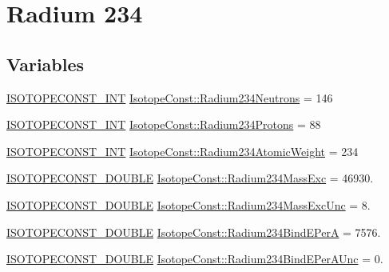\hypertarget{group___isotope_const-_radium-_ra234}{}\section{Radium 234}
\label{group___isotope_const-_radium-_ra234}
\subsection*{Variables}
\begin{DoxyCompactItemize}
\item 
\mbox{\hyperlink{group___isotope_const-_macros_ga5f18360b3e99483a35c32d789e62621c}{I\+S\+O\+T\+O\+P\+E\+C\+O\+N\+S\+T\+\_\+\+I\+NT}} \mbox{\hyperlink{group___isotope_const-_radium-_ra234_ga9af7d9100db8fe6e5155fb180ee6fbdd}{Isotope\+Const\+::\+Radium234\+Neutrons}} = 146
\item 
\mbox{\hyperlink{group___isotope_const-_macros_ga5f18360b3e99483a35c32d789e62621c}{I\+S\+O\+T\+O\+P\+E\+C\+O\+N\+S\+T\+\_\+\+I\+NT}} \mbox{\hyperlink{group___isotope_const-_radium-_ra234_ga36a374e9ba6789132c32a9378d404331}{Isotope\+Const\+::\+Radium234\+Protons}} = 88
\item 
\mbox{\hyperlink{group___isotope_const-_macros_ga5f18360b3e99483a35c32d789e62621c}{I\+S\+O\+T\+O\+P\+E\+C\+O\+N\+S\+T\+\_\+\+I\+NT}} \mbox{\hyperlink{group___isotope_const-_radium-_ra234_ga4780d67e8e77923087e5d189282f9f2d}{Isotope\+Const\+::\+Radium234\+Atomic\+Weight}} = 234
\item 
\mbox{\hyperlink{group___isotope_const-_macros_ga8f45a7272ce02c0b4c65c44636ed719a}{I\+S\+O\+T\+O\+P\+E\+C\+O\+N\+S\+T\+\_\+\+D\+O\+U\+B\+LE}} \mbox{\hyperlink{group___isotope_const-_radium-_ra234_ga2b53375d1629b89296be505cb1692fac}{Isotope\+Const\+::\+Radium234\+Mass\+Exc}} = 46930.
\item 
\mbox{\hyperlink{group___isotope_const-_macros_ga8f45a7272ce02c0b4c65c44636ed719a}{I\+S\+O\+T\+O\+P\+E\+C\+O\+N\+S\+T\+\_\+\+D\+O\+U\+B\+LE}} \mbox{\hyperlink{group___isotope_const-_radium-_ra234_ga8889345f102b6eb3e14aec635c182794}{Isotope\+Const\+::\+Radium234\+Mass\+Exc\+Unc}} = 8.
\item 
\mbox{\hyperlink{group___isotope_const-_macros_ga8f45a7272ce02c0b4c65c44636ed719a}{I\+S\+O\+T\+O\+P\+E\+C\+O\+N\+S\+T\+\_\+\+D\+O\+U\+B\+LE}} \mbox{\hyperlink{group___isotope_const-_radium-_ra234_gaf5253a24c0698bc3004f76930d8a4239}{Isotope\+Const\+::\+Radium234\+Bind\+E\+PerA}} = 7576.
\item 
\mbox{\hyperlink{group___isotope_const-_macros_ga8f45a7272ce02c0b4c65c44636ed719a}{I\+S\+O\+T\+O\+P\+E\+C\+O\+N\+S\+T\+\_\+\+D\+O\+U\+B\+LE}} \mbox{\hyperlink{group___isotope_const-_radium-_ra234_ga75ca4fa3738d53e87e175c7cdce836c5}{Isotope\+Const\+::\+Radium234\+Bind\+E\+Per\+A\+Unc}} = 0.

\end{DoxyCompactItemize}
